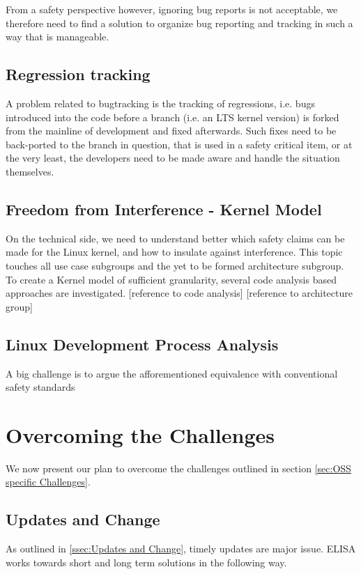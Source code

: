 \documentclass[12pt]{ElisaPaper}
\begin{document}
From a safety perspective however, ignoring bug reports is not acceptable, we therefore need to find a solution to organize bug reporting and tracking in such a way that is manageable.

\subsection{Regression tracking}
A problem related to bugtracking is the tracking of regressions, i.e. bugs introduced into the code before a branch (i.e. an LTS kernel version) is forked from the mainline of development and fixed afterwards. Such fixes need to be back-ported to the branch in question, that is used in a safety critical item, or at the very least, the developers need to be made aware and handle the situation themselves.



\subsection{Freedom from Interference - Kernel Model}
On the technical side, we need to understand better which safety claims can be made for the Linux kernel, and how to insulate against interference. 
This topic touches all use case subgroups and the yet to be formed architecture subgroup.
To create a Kernel model of sufficient granularity, several code analysis based approaches are investigated.
[reference to code analysis]
[reference to architecture group]

\subsection{Linux Development Process Analysis}
A big challenge is to argue the afforementioned equivalence with conventional safety standards 


\section{Overcoming the Challenges}
We now present our plan to overcome the challenges outlined in section \ref{sec:OSS specific Challenges}.

\subsection{Updates and Change}
As outlined in \ref{ssec:Updates and Change}, timely updates are major issue. ELISA works towards short and long term solutions in the following way.
\end{document}

